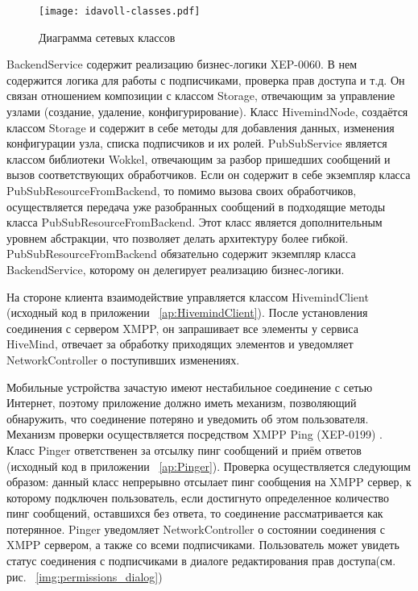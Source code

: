 \begin{figure}
  \centering
  \texttt{[image: idavoll-classes.pdf]}
  \caption{Диаграмма сетевых классов}
  \label{img:network_classes}
\end{figure}

BackendService содержит реализацию бизнес-логики XEP-0060. В нем содержится
логика для работы с подписчиками, проверка прав доступа и т.д. Он связан
отношением композиции с классом Storage, отвечающим за управление узлами
(создание, удаление, конфигурирование). Класс HivemindNode, создаётся классом
Storage и содержит в себе методы для добавления данных, изменения конфигурации
узла, списка подписчиков и их ролей. PubSubService является классом библиотеки
Wokkel, отвечающим за разбор пришедших сообщений и вызов соответствующих
обработчиков. Если он содержит в себе экземпляр класса
PubSubResourceFromBackend, то помимо вызова своих обработчиков, осуществляется
передача уже разобранных сообщений в подходящие методы класса
PubSubResourceFromBackend. Этот класс является дополнительным
уровнем абстракции, что позволяет делать архитектуру более гибкой.
PubSubResourceFromBackend обязательно содержит экземпляр класса BackendService,
которому он делегирует реализацию бизнес-логики.

На стороне клиента взаимодействие управляется классом HivemindClient (исходный
код в приложении ~\ref{ap:HivemindClient}). После установления соединения с
сервером XMPP, он запрашивает все элементы у сервиса HiveMind, отвечает за
обработку приходящих элементов и уведомляет NetworkController о поступивших
изменениях.

Мобильные устройства зачастую имеют нестабильное соединение с сетью Интернет,
поэтому приложение должно иметь механизм, позволяющий обнаружить, что соединение
потеряно и уведомить об этом пользователя. Механизм проверки осуществляется
посредством XMPP Ping (XEP-0199) \cite{xep-0199}. Класс Pinger ответственен за
отсылку пинг сообщений и приём ответов (исходный код в приложении
~\ref{ap:Pinger}). Проверка осуществляется следующим образом: данный класс
непрерывно отсылает пинг сообщения на XMPP сервер, к которому подключен
пользователь, если достигнуто определенное количество пинг сообщений, оставшихся
без ответа, то соединение рассматривается как потерянное. Pinger уведомляет
NetworkController о состоянии соединения с XMPP сервером, а также со всеми
подписчиками. Пользователь может увидеть статус соединения с подписчиками в
диалоге редактирования прав доступа(см. рис. ~\ref{img:permissions_dialog})

